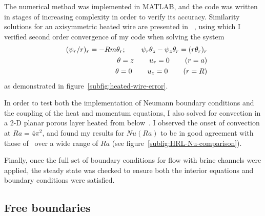 \documentclass[11pt]{proc}
\begin{document}
The numerical method was implemented in MATLAB, and the code was written in stages of increasing complexity in order to verify its accuracy. Similarity solutions for an axisymmetric heated wire are presented in ~\citet*[Chapter~5.9]{nield-bejan-06}, using which I verified second order convergence of my code when solving the system
\begin{eqnarray}
&&(\psi_r/r)_r = -Rm \theta_r; \hspace{5ex} \psi_r \theta_z - \psi_z \theta_r = (r \theta_r)_r \\
&&\theta = z \hspace{5ex} u_r = 0 \hspace{5ex} (r=a) \\
&&\theta = 0 \hspace{5ex} u_z = 0 \hspace{5ex} (r=R)
\end{eqnarray}
as demonstrated in figure~\ref{subfig:heated-wire-error}.

In order to test both the implementation of Neumann boundary conditions and the coupling of the heat and momentum equations, I also solved for convection in a 2-D planar porous layer heated from below~\citep*{horton-rogers-45,lapwood-48}. I observed the onset of convection at $Ra = 4 \pi^2$, and found my results for $Nu(Ra)$ to be in good agreement with those of~\citet*{caltagirone-75} over a wide range of $Ra$ (see figure~\ref{subfig:HRL-Nu-comparison}).

Finally, once the full set of boundary conditions for flow with brine channels were applied, the steady state was checked to ensure both the interior equations and boundary conditions were satisfied.

\subsection{Free boundaries}
\label{sec:free-boundary-method}
\end{document}
